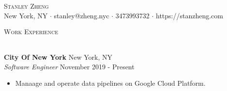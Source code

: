 \documentclass[a4paper]{article}
\newcommand{\lineunder} {
    \vspace*{-8pt} \\
    \hspace*{-18pt} \hrulefill \\
}
\newcommand{\header} [1] {
    {\hspace*{-18pt}\vspace*{6pt} \textsc{#1}}
    \vspace*{-6pt} \lineunder
}
\begin{document}
\vspace*{-40pt}

    

\vspace*{-10pt}
\begin{center}
	{\Huge \scshape {Stanley Zheng}}\\
	New York, NY $\cdot$ stanley@zheng.nyc $\cdot$ 3473993732 $\cdot$ https://stanzheng.com\\
\end{center}

\header{Work Experience}
\vspace{1mm}

\textbf{City Of New York} \hfill New York, NY\\
\textit{Software Engineer} \hfill November 2019 - Present\\
\vspace{-1mm}
\begin{itemize} \itemsep 1pt
	\item Manaage and operate data pipelines on Google Cloud Platform.
\end{itemize}
\end{document}
